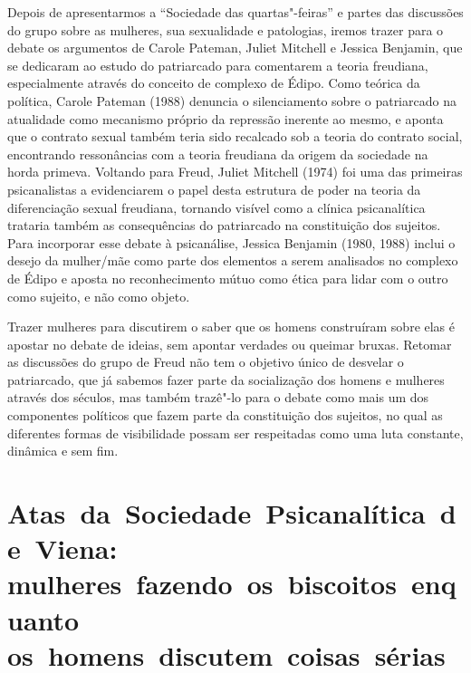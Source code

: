 Depois de apresentarmos a ``Sociedade das quartas"-feiras'' e partes das
discussões do grupo sobre as mulheres, sua sexualidade e patologias,
iremos trazer para o debate os argumentos de Carole Pateman,
Juliet Mitchell e Jessica Benjamin, que se dedicaram
ao estudo do patriarcado para comentarem a teoria freudiana,
especialmente através do conceito de complexo de Édipo. Como teórica da
política, Carole Pateman (1988) denuncia o silenciamento sobre o
patriarcado na atualidade como mecanismo próprio da repressão inerente
ao mesmo, e aponta que o contrato sexual também teria sido recalcado sob
a teoria do contrato social, encontrando ressonâncias com a teoria
freudiana da origem da sociedade na horda primeva. Voltando para Freud,
Juliet Mitchell (1974) foi uma das primeiras psicanalistas a
evidenciarem o papel desta estrutura de poder na teoria da diferenciação
sexual freudiana, tornando visível como a clínica psicanalítica trataria
também as consequências do patriarcado na constituição dos sujeitos.
Para incorporar esse debate à psicanálise, Jessica Benjamin (1980, 1988)
inclui o desejo da mulher/mãe como parte dos elementos a serem
analisados no complexo de Édipo e aposta no reconhecimento mútuo como
ética para lidar com o outro como sujeito, e não como objeto.

Trazer mulheres para discutirem o saber que os homens construíram sobre
elas é apostar no debate de ideias, sem apontar verdades ou queimar
bruxas. Retomar as discussões do grupo de Freud não tem o objetivo único
de desvelar o patriarcado, que já sabemos fazer parte da socialização
dos homens e mulheres através dos séculos, mas também trazê"-lo para o
debate como mais um dos componentes políticos que fazem parte da
constituição dos sujeitos, no qual as diferentes formas de visibilidade
possam ser respeitadas como uma luta constante, dinâmica e sem fim.

\section{Atas~da~Sociedade~Psicanalítica~de~Viena: mulheres~fazendo~os~biscoitos~enquanto os~homens~discutem~coisas~sérias}

